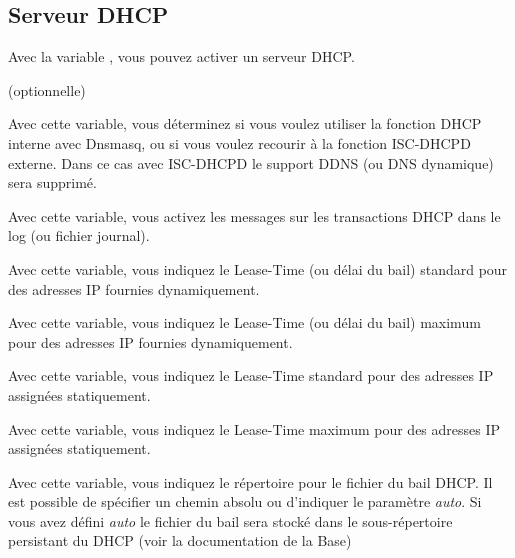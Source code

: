 \subsection{Serveur DHCP}

\begin{description}

    {Avec la variable , vous pouvez activer un serveur DHCP.}

     (optionnelle)

    {Avec cette variable, vous déterminez si vous voulez utiliser la fonction
    DHCP interne avec Dnsmasq, ou si vous voulez recourir à la fonction ISC-DHCPD
    externe. Dans ce cas avec ISC-DHCPD le support DDNS (ou DNS dynamique)
    sera supprimé.}


    {Avec cette variable, vous activez les messages sur les transactions DHCP
    dans le log (ou fichier journal).}


    {Avec cette variable, vous indiquez le Lease-Time (ou délai du bail) standard
    pour des adresses IP fournies dynamiquement.}


    {Avec cette variable, vous indiquez le Lease-Time (ou délai du bail) maximum
    pour des adresses IP fournies dynamiquement.}


    {Avec cette variable, vous indiquez le Lease-Time standard pour des
    adresses IP assignées statiquement.}


    {Avec cette variable, vous indiquez le Lease-Time maximum pour des
    adresses IP assignées statiquement.}


    {Avec cette variable, vous indiquez le répertoire pour le fichier du bail DHCP.
    Il est possible de spécifier un chemin absolu ou d'indiquer le paramètre \emph{auto}.
    Si vous avez défini \emph{auto} le fichier du bail sera stocké dans le sous-répertoire
    persistant du DHCP (voir la documentation de la Base)}


\end{description}
